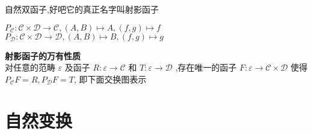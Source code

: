 \documentclass{article}
\begin{document}
\begin{flushleft}
$\textbf{自然双函子}$,好吧它的真正名字叫$\textbf{射影函子}$ \\
\begin{center}
$P_{\mathcal{C}} \colon \mathcal{C} \times \mathcal{D} \rightarrow \mathcal{C},\left( A,B \right)\mapsto A,\left( f,g \right)\mapsto f$ \\ \vbox{}
$P_{\mathcal{D}} \colon \mathcal{C} \times \mathcal{D} \rightarrow \mathcal{D},\left( A,B \right)\mapsto B,\left( f,g \right)\mapsto g$ \\
\end{center} 
\end{flushleft}




\begin{flushleft}
\textbf{射影函子的万有性质} \\
对任意的范畴 $\varepsilon$ 及函子 $R\colon \varepsilon \rightarrow \mathcal{C}$    和 $T\colon \varepsilon \rightarrow \mathcal{D}$ ,存在唯一的函子 $F\colon \varepsilon \rightarrow \mathcal{C}\times\mathcal{D}$ 使得 $P_{\mathcal{C}}F=R,P_{\mathcal{D}}F=T$, 即下面交换图表示
\end{flushleft}

\begin{center}
\end{center}

\section{自然变换}
\end{document}
